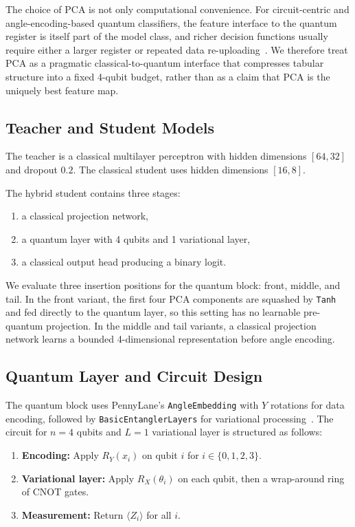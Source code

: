 \documentclass[11pt,a4paper]{article}
\begin{document}
The choice of PCA is not only computational convenience. For circuit-centric and angle-encoding-based
quantum classifiers, the feature interface to the quantum register is itself part of the model class,
and richer decision functions usually require either a larger register or repeated data
re-uploading~\cite{schuld2020circuit,perezsalinas2020reuploading,schuld2021encoding}. We therefore
treat PCA as a pragmatic classical-to-quantum interface that compresses tabular structure into a
fixed 4-qubit budget, rather than as a claim that PCA is the uniquely best feature map.

\subsection{Teacher and Student Models}
The teacher is a classical multilayer perceptron with hidden dimensions $[64,32]$ and dropout $0.2$.
The classical student uses hidden dimensions $[16,8]$.

The hybrid student contains three stages:
\begin{enumerate}
\item a classical projection network,
\item a quantum layer with 4 qubits and 1 variational layer,
\item a classical output head producing a binary logit.
\end{enumerate}
We evaluate three insertion positions for the quantum block: front, middle, and tail. In the front
variant, the first four PCA components are squashed by \texttt{Tanh} and fed directly to the quantum
layer, so this setting has no learnable pre-quantum projection. In the middle and tail variants, a
classical projection network learns a bounded 4-dimensional representation before angle encoding.

\subsection{Quantum Layer and Circuit Design}
\label{subsec:circuit}

The quantum block uses PennyLane's \texttt{AngleEmbedding} with $Y$ rotations for data encoding,
followed by \texttt{BasicEntanglerLayers} for variational processing~\cite{pennylane}. The circuit
for $n=4$ qubits and $L=1$ variational layer is structured as follows:

\begin{enumerate}
\item \textbf{Encoding:} Apply $R_Y(x_i)$ on qubit $i$ for $i \in \{0,1,2,3\}$.
\item \textbf{Variational layer:} Apply $R_X(\theta_i)$ on each qubit, then a wrap-around ring of
CNOT gates.
\item \textbf{Measurement:} Return $\langle Z_i \rangle$ for all $i$.
\end{enumerate}
\end{document}
